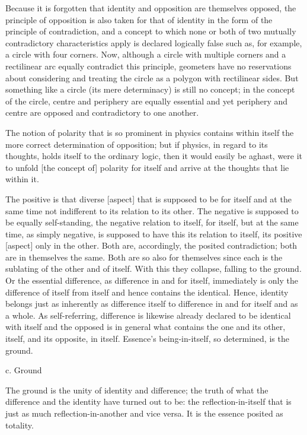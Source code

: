     Because it is forgotten that identity and opposition are themselves opposed,
    the principle of opposition is also taken for that of identity
    in the form of the principle of contradiction, and
    a concept to which none or both of two mutually
    contradictory characteristics apply is declared logically false
    such as, for example, a circle with four corners.
    Now, although a circle with multiple corners and a rectilinear arc
    equally contradict this principle, geometers have no reservations about
    considering and treating the circle as a polygon with rectilinear sides.
    But something like a circle (its mere determinacy) is still no concept;
    in the concept of the circle, centre and periphery are equally essential and
    yet periphery and centre are opposed and contradictory to one another.

    The notion of polarity that is so prominent in physics contains
    within itself the more correct determination of opposition;
    but if physics, in regard to its thoughts, holds itself to the ordinary logic,
    then it would easily be aghast, were it to unfold [the concept of]
    polarity for itself and arrive at the thoughts that lie within it.

The positive is that diverse [aspect]
that is supposed to be for itself and at the same time
not indifferent to its relation to its other.
The negative is supposed to be equally self-standing,
the negative relation to itself, for itself,
but at the same time, as simply negative,
is supposed to have this its relation to itself,
its positive [aspect] only in the other.
Both are, accordingly, the posited contradiction;
both are in themselves the same.
Both are so also for themselves since each is
the sublating of the other and of itself.
With this they collapse, falling to the ground.
Or the essential difference, as difference in and for itself,
immediately is only the difference of itself from itself
and hence contains the identical.
Hence, identity belongs just as inherently as difference itself
to difference in and for itself and as a whole.
As self-referring, difference is likewise already
declared to be identical with itself and
the opposed is in general what contains the one and its other,
itself, and its opposite, in itself.
Essence's being-in-itself, so determined, is the ground.

c. Ground

The ground is the unity of identity and difference;
the truth of what the difference and the identity have turned out to be:
the reflection-in-itself that is just as much
reflection-in-another and vice versa.
It is the essence posited as totality.


